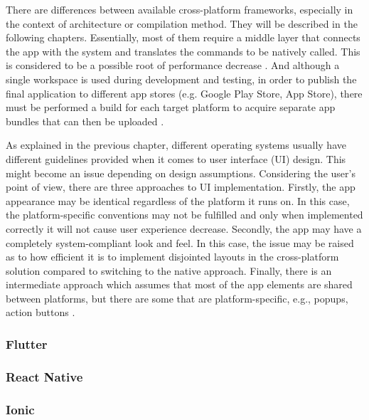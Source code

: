 There are differences between available cross-platform frameworks, especially in the context of 
architecture or compilation method. They will be described in the following chapters. Essentially, most of them require a middle layer that connects the app with the system and translates the commands to be natively called. This is considered to be a possible root of performance decrease \cite{appdynamics_mobile_app_performance}. And although a single workspace is used during development and testing, in order to publish the final application to different app stores (e.g. Google Play Store, App Store), there must be performed a build for each target platform to acquire separate app bundles that can then be uploaded \cite{comp_study_hybrid}.

As explained in the previous chapter, different operating systems usually have different guidelines provided when it comes to user interface (UI) design. This might become an issue depending on design assumptions. Considering the user's point of view, there are three approaches to UI implementation. Firstly, the app appearance may be identical regardless of the platform it runs on. In this case, the platform-specific conventions may not be fulfilled and only when implemented correctly it will not cause user experience decrease. Secondly, the app may have a completely system-compliant look and feel. In this case, the issue may be raised as to how efficient it is to implement disjointed layouts in the cross-platform solution compared to switching to the native approach. Finally, there is an intermediate approach which assumes that most of the app elements are shared between platforms, but there are some that are platform-specific, e.g., popups, action buttons \cite{cross_platform_ux,baseline_cross_platform}.



\subsubsection{Flutter}



\subsubsection{React Native}



\subsubsection{Ionic}



